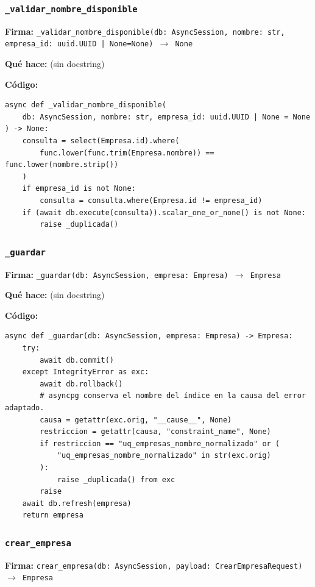 \documentclass[11pt,a4paper]{article}
\begin{document}
\subsubsection*{\texttt{\_validar\_nombre\_disponible}}
\textbf{Firma:} \texttt{\_validar\_nombre\_disponible(db: AsyncSession, nombre: str, empresa\_id: uuid.UUID | None=None) $\rightarrow$ None}

\textbf{Qué hace:} (sin docstring)

\textbf{Código:}
\begin{lstlisting}
async def _validar_nombre_disponible(
    db: AsyncSession, nombre: str, empresa_id: uuid.UUID | None = None
) -> None:
    consulta = select(Empresa.id).where(
        func.lower(func.trim(Empresa.nombre)) == func.lower(nombre.strip())
    )
    if empresa_id is not None:
        consulta = consulta.where(Empresa.id != empresa_id)
    if (await db.execute(consulta)).scalar_one_or_none() is not None:
        raise _duplicada()
\end{lstlisting}

\subsubsection*{\texttt{\_guardar}}
\textbf{Firma:} \texttt{\_guardar(db: AsyncSession, empresa: Empresa) $\rightarrow$ Empresa}

\textbf{Qué hace:} (sin docstring)

\textbf{Código:}
\begin{lstlisting}
async def _guardar(db: AsyncSession, empresa: Empresa) -> Empresa:
    try:
        await db.commit()
    except IntegrityError as exc:
        await db.rollback()
        # asyncpg conserva el nombre del índice en la causa del error adaptado.
        causa = getattr(exc.orig, "__cause__", None)
        restriccion = getattr(causa, "constraint_name", None)
        if restriccion == "uq_empresas_nombre_normalizado" or (
            "uq_empresas_nombre_normalizado" in str(exc.orig)
        ):
            raise _duplicada() from exc
        raise
    await db.refresh(empresa)
    return empresa
\end{lstlisting}

\subsubsection*{\texttt{crear\_empresa}}
\textbf{Firma:} \texttt{crear\_empresa(db: AsyncSession, payload: CrearEmpresaRequest) $\rightarrow$ Empresa}
\end{document}
